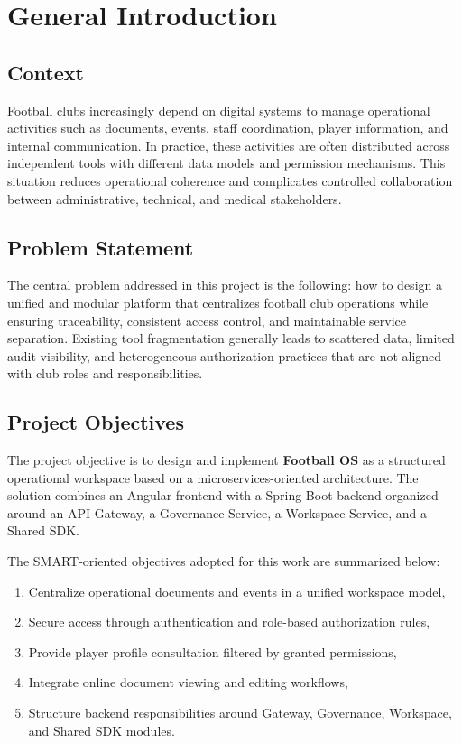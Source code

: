 ﻿\chapter*{General Introduction}

\section*{Context}
Football clubs increasingly depend on digital systems to manage operational
activities such as documents, events, staff coordination, player information,
and internal communication. In practice, these activities are often distributed
across independent tools with different data models and permission mechanisms.
This situation reduces operational coherence and complicates controlled
collaboration between administrative, technical, and medical stakeholders.

\section*{Problem Statement}
The central problem addressed in this project is the following: how to design a
unified and modular platform that centralizes football club operations while
ensuring traceability, consistent access control, and maintainable service
separation. Existing tool fragmentation generally leads to scattered data,
limited audit visibility, and heterogeneous authorization practices that are not
aligned with club roles and responsibilities.

\section*{Project Objectives}
The project objective is to design and implement \textbf{Football OS} as a
structured operational workspace based on a microservices-oriented
architecture. The
solution combines an Angular frontend with a Spring Boot backend organized
around an API Gateway, a Governance Service, a Workspace Service, and a Shared
SDK.

The SMART-oriented objectives adopted for this work are summarized below:
\begin{enumerate}
    \item Centralize operational documents and events in a unified workspace model,
    \item Secure access through authentication and role-based authorization rules,
    \item Provide player profile consultation filtered by granted permissions,
    \item Integrate online document viewing and editing workflows,
    \item Structure backend responsibilities around Gateway, Governance, Workspace, and Shared SDK modules.
\end{enumerate}

